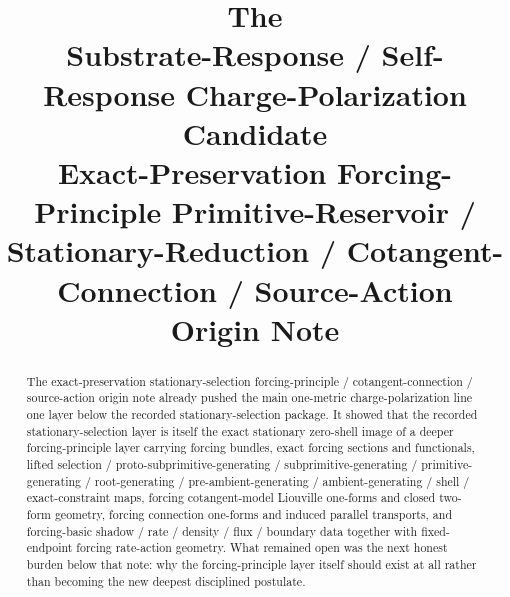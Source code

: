 \documentclass[11pt]{article}
\title{\textbf{The \TheoryName{}}\\[0.4em]
\large Substrate-Response / Self-Response Charge-Polarization Candidate\\
\large Exact-Preservation Forcing-Principle Primitive-Reservoir / Stationary-Reduction / Cotangent-Connection / Source-Action\\
\large Origin Note}
\author{}
\date{}
\begin{document}
\maketitle

\begin{abstract}
The exact-preservation stationary-selection forcing-principle / cotangent-connection / source-action origin note already pushed the main one-metric charge-polarization line one layer below the recorded stationary-selection package. It showed that the recorded stationary-selection layer is itself the exact stationary zero-shell image of a deeper forcing-principle layer carrying forcing bundles, exact forcing sections and functionals, lifted selection / proto-subprimitive-generating / subprimitive-generating / primitive-generating / root-generating / pre-ambient-generating / ambient-generating / shell / exact-constraint maps, forcing cotangent-model Liouville one-forms and closed two-form geometry, forcing connection one-forms and induced parallel transports, and forcing-basic shadow / rate / density / flux / boundary data together with fixed-endpoint forcing rate-action geometry. What remained open was the next honest burden below that note: why the forcing-principle layer itself should exist at all rather than becoming the new deepest disciplined postulate.


\end{abstract}
\end{document}
